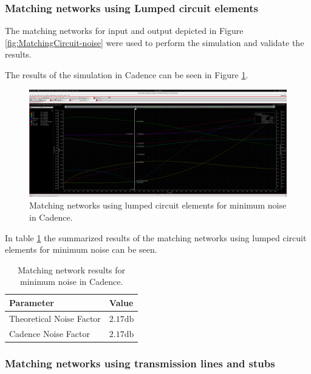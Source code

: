 \subsubsection{Matching networks using Lumped circuit elements}

The matching networks for input and output depicted in Figure \ref{fig:MatchingCircuit-noise} were used to perform the simulation and validate the results.

The results of the simulation in Cadence can be seen in Figure \ref{fig:CadenceNoiseMatchingCircuit}.
\begin{figure}[H]
    \centering
    \includegraphics[width=1\textwidth]{Images/CAD-LCmatchNoise.png}
    \caption{Matching networks using lumped circuit elements for minimum noise in Cadence.}
    \label{fig:CadenceNoiseMatchingCircuit}
\end{figure}

In table \ref{tab:NoiseMatchingParameters} the summarized results of the matching networks using lumped circuit elements for minimum noise can be seen.
\begin{table}[H]
    \centering
    \caption{Matching network results for minimum noise in Cadence.}
    \begin{tabularx}{\textwidth}{>{\centering\arraybackslash}X >{\centering\arraybackslash}X}
        \toprule
        \textbf{Parameter} & \textbf{Value} \\
        \midrule
        Theoretical Noise Factor  & $2.17 \si{\decibel}$ \\
        \midrule
        Cadence Noise Factor & $2.17 \si{\decibel}$ \\
        \bottomrule
    \end{tabularx}
    \label{tab:NoiseMatchingParameters}
\end{table}

\subsubsection{Matching networks using transmission lines and stubs}

